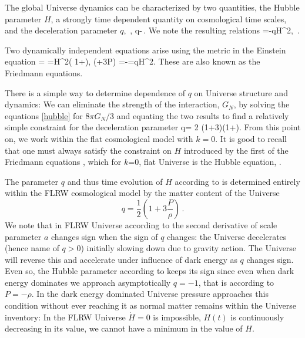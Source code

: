 The global Universe dynamics can be characterized by two quantities, the Hubble parameter $H$, a strongly time dependent quantity on cosmological time scales, and the deceleration parameter $q$,
\beqn\label{dynamic}
\,, 
\eeqn
\beqn\label{dynamic1}
q\equiv -\,.
\eeqn
We note the resulting relations
\beqn\label{eq:Hdot1}
 =-qH^2,
 \eeqn
\beqn\label{eq:Hdot}
 \,. 
\eeqn
{}

Two dynamically independent equations arise using the metric  in the Einstein equation 
\beqn\label{hubble}
 \rho = 
=H^2\left( 1+\right),
\qquad
{} (\rho+3P) =-=qH^2.
\eeqn
These are also known as the Friedmann equations. 

There is a simple way to determine dependence of $q$ on Universe structure and dynamics: We can eliminate the strength of the interaction, $G_N$, by solving the equations \eqref{hubble} for ${8\pi G_N}/{3}$ and equating the two results to find a relatively simple constraint for the deceleration parameter
\beqn\label{qparam0}
q= 2 \left(1+3\right)\left(1+\right).
\eeqn
From this point on, we work within the flat cosmological model with $k=0$. It is good to recall that one must always satisfy the constraint on $H$ introduced by the first of the Friedmann equations , which for $k$=0, flat Universe is the Hubble equation, .

The parameter $q$ and thus time evolution of $H$ according to  is determined entirely within the FLRW cosmological model by the matter content of the Universe
\begin{equation}\label{qparam}
\boxed{q=\frac 1 2 \left(1+3\frac{P}{\rho}\right)}\,.
\end{equation}
We note that in FLRW Universe according to  the second derivative of scale parameter $a$ changes sign when the sign of $q$ changes: the Universe decelerates (hence name of $q>0$) initially slowing down due to gravity action. The Universe will reverse this and accelerate under influence of dark energy as $q$ changes sign. Even so, the Hubble parameter according to  keeps its sign since even when dark energy dominates we approach asymptotically $q=-1$, that is according to  $P=-\rho$. In the dark energy dominated Universe pressure approaches this condition without ever reaching it as normal matter remains within the Universe inventory: In the FLRW Universe $\dot H=0$ is impossible, $H(t)$ is continuously decreasing in its value, we cannot have a minimum in the value of $H$. 

